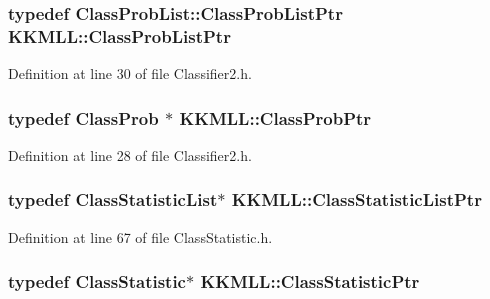 \subsubsection[{\texorpdfstring{Class\+Prob\+List\+Ptr}{ClassProbListPtr}}]{\setlength{\rightskip}{0pt plus 5cm}typedef {\bf Class\+Prob\+List\+::\+Class\+Prob\+List\+Ptr} {\bf K\+K\+M\+L\+L\+::\+Class\+Prob\+List\+Ptr}}\hypertarget{namespace_k_k_m_l_l_a60f96a524ddb189eff2b4391cf0b651c}{}\label{namespace_k_k_m_l_l_a60f96a524ddb189eff2b4391cf0b651c}


Definition at line 30 of file Classifier2.\+h.

\subsubsection[{\texorpdfstring{Class\+Prob\+Ptr}{ClassProbPtr}}]{\setlength{\rightskip}{0pt plus 5cm}typedef {\bf Class\+Prob} $\ast$ {\bf K\+K\+M\+L\+L\+::\+Class\+Prob\+Ptr}}\hypertarget{namespace_k_k_m_l_l_aac4f1402b049fe046f3fa6c789a0c5d0}{}\label{namespace_k_k_m_l_l_aac4f1402b049fe046f3fa6c789a0c5d0}


Definition at line 28 of file Classifier2.\+h.

\subsubsection[{\texorpdfstring{Class\+Statistic\+List\+Ptr}{ClassStatisticListPtr}}]{\setlength{\rightskip}{0pt plus 5cm}typedef {\bf Class\+Statistic\+List}$\ast$ {\bf K\+K\+M\+L\+L\+::\+Class\+Statistic\+List\+Ptr}}\hypertarget{namespace_k_k_m_l_l_a94c12d8466d389018764e996caebf7a1}{}\label{namespace_k_k_m_l_l_a94c12d8466d389018764e996caebf7a1}


Definition at line 67 of file Class\+Statistic.\+h.

\subsubsection[{\texorpdfstring{Class\+Statistic\+Ptr}{ClassStatisticPtr}}]{\setlength{\rightskip}{0pt plus 5cm}typedef {\bf Class\+Statistic}$\ast$ {\bf K\+K\+M\+L\+L\+::\+Class\+Statistic\+Ptr}}\hypertarget{namespace_k_k_m_l_l_a85182174e5ae7ba508dad118983b37bc}{}\label{namespace_k_k_m_l_l_a85182174e5ae7ba508dad118983b37bc}


